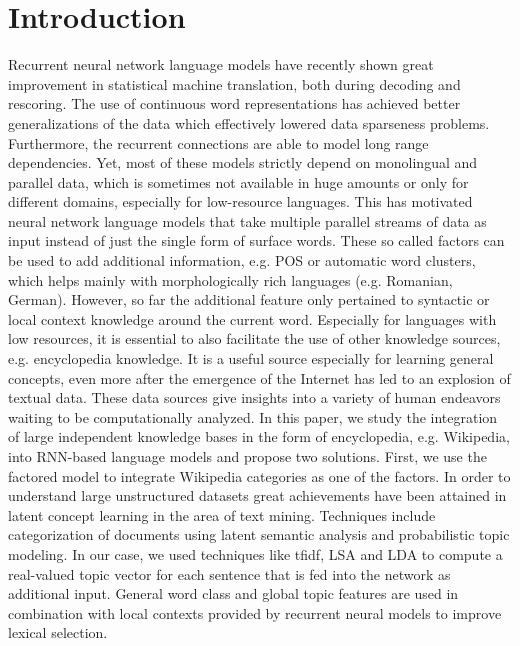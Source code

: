 \documentclass[a4paper]{article}
\begin{document}
\section{Introduction}
Recurrent neural network language models have recently shown great improvement in statistical machine translation, both during decoding and rescoring. The use of continuous word representations has achieved better generalizations of the data which effectively lowered data sparseness problems. Furthermore, the recurrent connections are able to model long range dependencies. Yet, most of these models strictly depend on monolingual and parallel data, which is sometimes not available in huge amounts or only for different domains, especially for low-resource languages.
This has motivated neural network language models that take multiple parallel streams of data as input instead of just the single form of surface words. These so called factors can be used to add additional information, e.g. POS or automatic word clusters, which helps mainly with morphologically rich languages (e.g. Romanian, German). However, so far the additional feature only pertained to syntactic or local context knowledge around the current word. Especially for languages with low resources, it is essential to also facilitate the use of other knowledge sources, e.g. encyclopedia knowledge. It is a useful source especially for learning general concepts, even more after the emergence of the Internet has led to an explosion of textual data. These data sources give insights into a variety of human endeavors waiting to be computationally analyzed.
In this paper, we study the integration of large independent knowledge bases in the form of encyclopedia, e.g. Wikipedia, into RNN-based language models and propose two solutions. 
First, we use  the factored model to integrate Wikipedia categories as one of the factors. In order to understand large unstructured datasets great achievements have been attained in latent concept learning in the area of text mining. Techniques include categorization of documents using latent semantic analysis and probabilistic topic modeling. In our case, we used techniques like tfidf, LSA and LDA to compute a real-valued topic vector for each sentence that is fed into the network as additional input. 
General word class and global topic features are used in combination with local contexts provided by recurrent neural models to improve lexical selection. 
\end{document}
